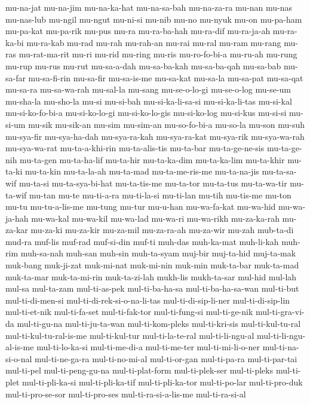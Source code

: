 {mu-na-jat mu-na-jim mu-na-ka-hat mu-na-sa-bah mu-na-za-ra mu-nan mu-nas
mu-nas-lub mu-ngil mu-ngut mu-ni-si mu-nib mu-no mu-nyuk mu-on mu-pa-ham
mu-pa-kat mu-pa-rik mu-pus mu-ra mu-ra-ba-hah mu-ra-dif mu-ra-ja-ah
mu-ra-ka-bi mu-ra-kab mu-rad mu-rah mu-rah-an mu-rai mu-ral mu-ram mu-rang
mu-ras mu-rat-ma-rit mu-ri mu-rid mu-ring mu-ris mu-ro-fo-bi-a mu-ru-ah
mu-rung mu-rup mu-rus mu-rut mu-sa-a-dah mu-sa-ba-kah mu-sa-ba-qah
mu-sa-bab mu-sa-far mu-sa-fi-rin mu-sa-fir mu-sa-is-me mu-sa-kat mu-sa-la
mu-sa-pat mu-sa-qat mu-sa-ra mu-sa-wa-rah mu-sal-la mu-sang mu-se-o-lo-gi
mu-se-o-log mu-se-um mu-sha-la mu-sho-la mu-si mu-si-bah mu-si-ka-li-sa-si
mu-si-ka-li-tas mu-si-kal mu-si-ko-fo-bi-a mu-si-ko-lo-gi mu-si-ko-lo-gis
mu-si-ko-log mu-si-kus mu-si-si mu-si-um mu-sik mu-sik-an mu-sim mu-sim-an
mu-so-fo-bi-a mu-so-la mu-son mu-suh mu-sya-fir mu-sya-ha-dah
mu-sya-ra-kah mu-sya-ra-kat mu-sya-rik mu-sya-wa-rah mu-sya-wa-rat
mu-ta-a-khi-rin mu-ta-alis-tis mu-ta-bar mu-ta-ge-ne-sis mu-ta-ge-nih
mu-ta-gen mu-ta-ha-lif mu-ta-hir mu-ta-ka-dim mu-ta-ka-lim mu-ta-khir
mu-ta-ki mu-ta-kin mu-ta-la-ah mu-ta-mad mu-ta-me-ris-me mu-ta-na-jis
mu-ta-sa-wif mu-ta-si mu-ta-sya-bi-hat mu-ta-tis-me mu-ta-tor mu-ta-tus
mu-ta-wa-tir mu-ta-wif mu-tan mu-te mu-ti-a-ra mu-ti-la-si mu-ti-lan
mu-tih mu-tis-me mu-ton mu-tu mu-tu-a-lis-me mu-tung mu-tur mu-u-han
mu-wa-fa-kat mu-wa-hid mu-wa-ja-hah mu-wa-kal mu-wa-kil mu-wa-lad mu-wa-ri
mu-wa-rikh mu-za-ka-rah mu-za-kar mu-za-ki mu-za-kir mu-za-mil mu-za-ra-ah
mu-za-wir mu-zah mub-ta-di mud-ra muf-lis muf-rad muf-si-din muf-ti
muh-das muh-ka-mat muh-li-kah muh-rim muh-sa-nah muh-san muh-sin
muh-ta-syam muj-bir muj-ta-hid muj-ta-mak muk-bang muk-ji-zat muk-mi-nat
muk-mi-nin muk-min muk-ta-bar muk-ta-mad muk-ta-mar muk-ta-mi-rin
muk-ta-zi-lah mukh-lis mukh-ta-sar mul-hid mul-lah mul-sa mul-ta-zam
mul-ti-as-pek mul-ti-ba-ha-sa mul-ti-ba-ha-sa-wan mul-ti-but
mul-ti-di-men-si mul-ti-di-rek-si-o-na-li-tas mul-ti-di-sip-li-ner
mul-ti-di-sip-lin mul-ti-et-nik mul-ti-fa-set mul-ti-fak-tor
mul-ti-fung-si mul-ti-ge-nik mul-ti-gra-vi-da mul-ti-gu-na
mul-ti-ju-ta-wan mul-ti-kom-pleks mul-ti-kri-sis mul-ti-kul-tu-ral
mul-ti-kul-tu-ral-is-me mul-ti-kul-tur mul-ti-la-te-ral mul-ti-li-ngu-al
mul-ti-li-ngu-al-is-me mul-ti-lo-ka-si mul-ti-me-di-a mul-ti-me-ter
mul-ti-mi-li-o-ner mul-ti-na-si-o-nal mul-ti-ne-ga-ra mul-ti-no-mi-al
mul-ti-or-gan mul-ti-pa-ra mul-ti-par-tai mul-ti-pel mul-ti-peng-gu-na
mul-ti-plat-form mul-ti-plek-ser mul-ti-pleks mul-ti-plet mul-ti-pli-ka-si
mul-ti-pli-ka-tif mul-ti-pli-ka-tor mul-ti-po-lar mul-ti-pro-duk
mul-ti-pro-se-sor mul-ti-pro-ses mul-ti-ra-si-a-lis-me mul-ti-ra-si-al
}
